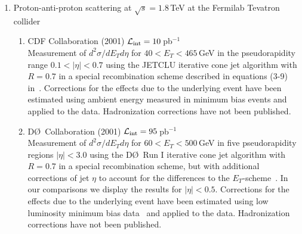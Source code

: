 \documentclass[11pt]{article}
\newcommand{\pythia}{{\sc pythia}}
\begin{document}
\begin{enumerate}
\begin{enumerate}
\item CDF Collaboration (2007) 
      ${\cal L_{\rm int}}=1.0\,$fb$^{-1}$~\cite{Abulencia:2007ez} \\
Measurement of
$d^2\sigma/dp_T dy$  for $52<p_T<700\,$GeV
     in five rapidity regions $|y|<2.1$ 
using the 
inclusive $k_T$ jet algorithm  with $R=0.7$ in the $E$-scheme. 
In our comparisons we display the results for $0.1<|y|<0.7$.
Non-perturbative corrections are determined 
using \pythia\ with tune A.


\item D\O\ Collaboration (2008) 
      ${\cal L_{\rm int}}=0.7\,$fb$^{-1}$~\cite{:2008hua}   \\
Measurement of
$d^2\sigma/dp_T dy$  for $50<p_T<600\,$GeV
     in six rapidity regions $|y|<2.4$
using the 
Run II iterative midpoint cone jet algorithm (D\O\ version) with $R=0.7$ 
in the $E$-scheme. 
In our comparisons we display the results for $|y|<0.4$.  
Non-perturbative corrections are determined 
using \pythia\ with tune QW~\cite{Group:2006rt}.


\end{enumerate}



\item Proton-anti-proton scattering at $\sqrt{s} = 1.8\,$TeV at the Fermilab Tevatron collider
\begin{enumerate}

\item CDF Collaboration (2001) 
      ${\cal L_{\rm int}}=10\,$pb$^{-1}$~\cite{Affolder:2001fa} \\
Measurement of
$d^2\sigma/dE_T d\eta$  for $40<E_T<465\,$GeV
     in the pseudorapidity range $0.1<|\eta|<0.7$ 
using the
JETCLU iterative cone jet algorithm with $R=0.7$  
    in a special recombination scheme
    described in equations (3-9) in~\cite{Affolder:2001fa}. 
Corrections for the effects due to the underlying event 
have been estimated using ambient energy measured in 
minimum bias events and applied to the data. 
Hadronization corrections have not been published.


\item D\O\ Collaboration (2001) 
      ${\cal L_{\rm int}}=95\,$pb$^{-1}$~\cite{Abbott:2000ew}  \\
Measurement of
$d^2\sigma/dE_T d\eta$  for $60<E_T<500\,$GeV
     in five pseudorapidity regions $|\eta|<3.0$ 
using the 
D\O\ Run I iterative cone jet algorithm with $R=0.7$ 
  in a special recombination scheme, but with additional corrections 
  of jet $\eta$ to account for the differences 
  to the $E_T$-scheme~\cite{Babukhadia}.
In our comparisons we display the results for $|\eta|<0.5$.
Corrections for the effects due to the underlying event 
have been estimated using low luminosity minimum bias
data~\cite{Abbott:1998xw} and applied to the data.
Hadronization corrections have not been published.


\end{enumerate}
\end{enumerate}
\end{document}

